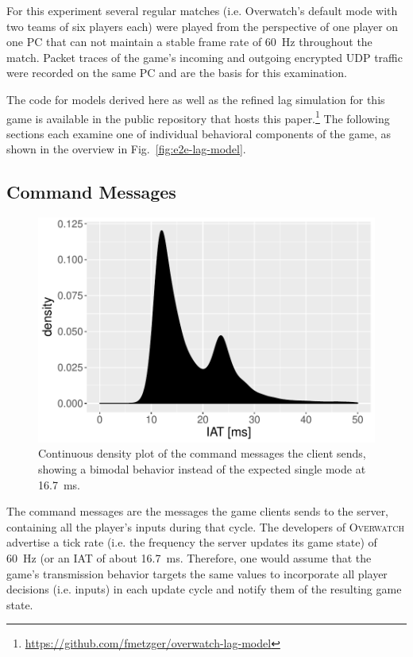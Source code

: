 For this experiment several regular matches (i.e. Overwatch's default mode with two teams of six players each) were played from the perspective of one player on one PC that can not maintain a stable frame rate of \SI{60}{\hertz} throughout the match. Packet traces of the game's incoming and outgoing encrypted UDP traffic were recorded on the same PC and are the basis for this examination. 

The code for models derived here as well as the refined lag simulation for this game is available in the public repository that hosts this paper.\footnote{\url{https://github.com/fmetzger/overwatch-lag-model}}
The following sections each examine one of individual behavioral components of the game, as shown in the overview in Fig.~\ref{fig:e2e-lag-model}.


\subsection{Command Messages}

\begin{figure}[t]
	\centering
	\includegraphics[width=1.0\columnwidth]{images/command-density.pdf}
	\caption{Continuous density plot of the command messages the client sends, showing a bimodal behavior instead of the expected single mode at \SI{16.7}{\milli\second}.}
\label{fig:command-density}
\end{figure}

The command messages are the messages the game clients sends to the server, containing all the player's inputs during that cycle. The developers of \textsc{Overwatch} advertise a tick rate (i.e. the frequency the server updates its game state) of \SI{60}{\hertz} (or an \gls{IAT} of about \SI{16.7}{\milli\second}. Therefore, one would assume that the game's transmission behavior targets the same values to incorporate all player decisions (i.e. inputs) in each update cycle and notify them of the resulting game state.


